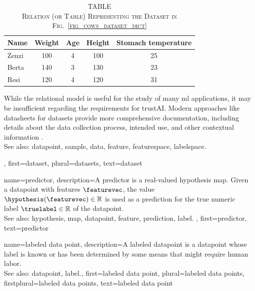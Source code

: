 {{		\begin{table}[H]
			\caption*{
				\centering 
				\scshape TABLE \thetable \\[0.5ex]
				\scshape Relation (or Table) Representing the Dataset in Fig.\ \ref{fig_cows_dataset_dict} 
			}
			\label{tab:cowdata_dict} 
			\centering
			\begin{tabular}{lcccc}
				\hline
				\textbf{Name} & \textbf{Weight} & \textbf{Age} & \textbf{Height} & \textbf{Stomach temperature} \\
				\hline
				Zenzi & 100 & 4 & 100 & 25 \\
				Berta & 140 & 3 & 130 & 23 \\
				Resi  & 120 & 4 & 120 & 31 \\
				\hline
			\end{tabular}
		\end{table}
 		While the \gls{relational model} is useful for the study of many \gls{ml} applications, 
		it may be insufficient regarding the requirements for \gls{trustAI}. Modern 
 		approaches like datasheets for datasets provide more comprehensive 
 		documentation, including details about the \gls{data} collection process, intended 
 		use, and other contextual information \cite{DatasheetData2021}.
 		\\
		See also: \gls{datapoint}, \gls{sample}, \gls{data}, \gls{feature}, \gls{featurespace}, \gls{labelspace}.},
	first={dataset},
	plural={datasets},
	text={dataset}  
}

{name={predictor},
	description={A predictor is a real-valued \gls{hypothesis} \gls{map}. 
		Given a \gls{datapoint} with \glspl{feature} $\featurevec$, the value 
		$\hypothesis(\featurevec) \in \mathbb{R}$ is used as a \gls{prediction} for the true 
		numeric \gls{label} $\truelabel \in \mathbb{R}$ of the \gls{datapoint}.
				\\
		See also: \gls{hypothesis}, \gls{map}, \gls{datapoint}, \gls{feature}, \gls{prediction}, \gls{label}. },
	first={predictor},
	text={predictor}  
}

{name={labeled data point},
 	description={A labeled \gls{datapoint} is a \gls{datapoint} whose \gls{label} is known 
		or has been determined by some means that might require human labor.
			\\
		See also: \gls{datapoint}, \gls{label}.},
 	first={labeled data point},
	plural={labeled data points},
	firstplural={labeled data points},
 	text={labeled data point}  
}
 
